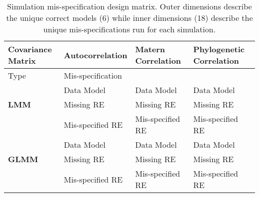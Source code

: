 \begin{table}[ht]
    \caption{Simulation mis-specification design matrix. Outer dimensions describe the unique correct models (6) while inner dimensions (18) describe the unique mis-specifications run for each simulation.}
    \begin{tabular}{l|llp{8cm}}
    \toprule
    Covariance Matrix & \textbf{Autocorrelation} & \textbf{Matern Correlation} & \textbf{Phylogenetic Correlation} \\
    \hline
     Type &\multicolumn{3}{l}{Mis-specification}\\
     \hline
     & Data Model & Data Model & Data Model \\
     \textbf{LMM}& Missing RE & Missing RE & Missing RE \\
     & Mis-specified RE & Mis-specified RE & Mis-specified RE \\
     \hline
     & Data Model & Data Model & Data Model \\
     \textbf{GLMM}& Missing RE & Missing RE & Missing RE \\
     & Mis-specified RE & Mis-specified RE & Mis-specified RE \\
    \bottomrule
    \end{tabular}
  \end{table}

